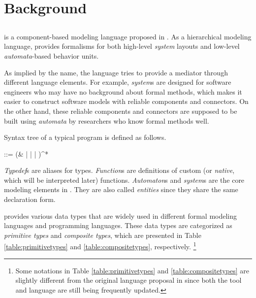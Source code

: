 \section{Background}
\label{sec:background}

\subsection{\lang{}}
\label{subsec:mediator}
\lang{} is a component-based modeling language proposed in \cite{LiFacsMediator2017}. As a hierarchical modeling language, \lang{} provides formalisms for both high-level \emph{system} layouts and low-level \emph{automata}-based behavior units. 

As implied by the name, the language tries to provide a mediator through different language elements. For example, \emph{system}s are designed for software engineers who may have no background about formal methods, which makes it easier to construct software models with reliable components and connectors. On the other hand, these reliable components and connectors are supposed to be built using \emph{automata} by researchers who know formal methods well.

Syntax tree of a typical \lang{} program is defined as follows.
\begin{bnf}
     ::=  (&  |  |  | )^*
\end{bnf}

\emph{Typedef}s are aliases for types. \emph{Function}s are definitions of custom (or \emph{native}, which will be interpreted later) functions. \emph{Automaton}s and \emph{system}s are the core modeling elements in \lang{}. They are also called \emph{entities} since they share the same declaration form. %

 \lang{} provides various data types that are widely used in different formal modeling languages and programming languages. These data types are categorized as \emph{primitive types} and \emph{composite types}, which are presented in Table \ref{table:primitivetypes} and \ref{table:compositetypes}, respectively. \footnote{Some notations in Table \ref{table:primitivetypes} and \ref{table:compositetypes} are slightly different from the original language proposal in \cite{LiFacsMediator2017} since both the tool and language are still being frequently updated.}

